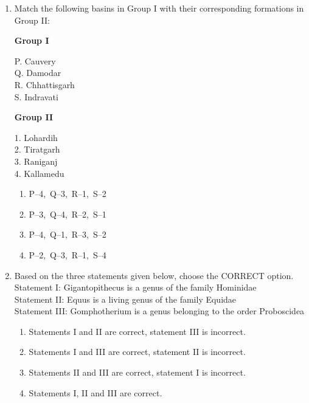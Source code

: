 \documentclass[journal,12pt,onecolumn]{IEEEtran}
\theoremstyle{remark}
\begin{document}
\begin{enumerate}
\item Match the following basins in Group I with their corresponding formations in Group II:

\begin{multicols}{2}
\textbf{Group I}
\begin{flushleft}
P. Cauvery\\
Q. Damodar\\
R. Chhattisgarh\\
S. Indravati
\end{flushleft}

\columnbreak

\textbf{Group II}
\begin{flushleft}
1. Lohardih\\
2. Tiratgarh\\
3. Raniganj\\
4. Kallamedu
\end{flushleft}
\end{multicols}

\begin{enumerate}
\item P--4,\ Q--3,\ R--1,\ S--2
\item P--3,\ Q--4,\ R--2,\ S--1
\item P--4,\ Q--1,\ R--3,\ S--2
\item P--2,\ Q--3,\ R--1,\ S--4
\end{enumerate}
\vspace{0.5cm}

\item Based on the three statements given below, choose the CORRECT option.\\
Statement I: Gigantopithecus is a genus of the family Hominidae\\
Statement II: Equus is a living genus of the family Equidae\\
Statement III: Gomphotherium is a genus belonging to the order Proboscidea
\begin{enumerate}
\item Statements I and II are correct, statement III is incorrect.
\item Statements I and III are correct, statement II is incorrect.
\item Statements II and III are correct, statement I is incorrect.
\item Statements I, II and III are correct.
\end{enumerate}
\vspace{0.5cm}


\end{enumerate}
\end{document}
